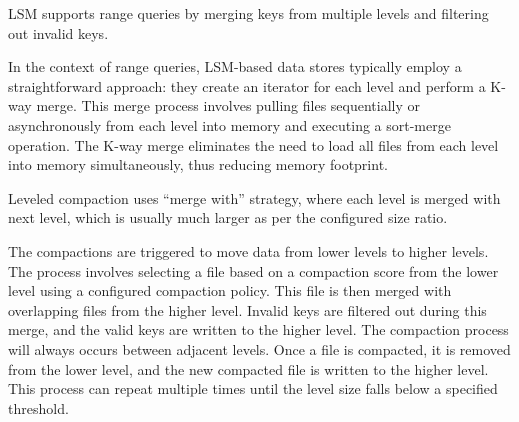  LSM supports range queries by merging keys from multiple levels and filtering out 
invalid keys.

In the context of range queries, LSM-based data stores typically employ a straightforward approach: they create an 
iterator for each level and perform a K-way merge. This merge process involves pulling files sequentially or 
asynchronously from each level into memory and executing a sort-merge operation. The K-way merge eliminates the need 
to load all files from each level into memory simultaneously, thus reducing memory footprint.

 Leveled compaction uses ``merge with'' strategy, where each level is merged with 
next level, which is usually much larger as per the configured size ratio.

The compactions are triggered to move data from lower levels to higher levels. The process involves selecting a file 
based on a compaction score from the lower level using a configured compaction policy. This file is then merged with 
overlapping files from the higher level. Invalid keys are filtered out during this merge, and the valid keys are 
written to the higher level. The compaction process will always occurs between adjacent levels. Once a file is compacted, 
it is removed from the lower level, and the new compacted file is written to the higher level. This process can repeat
multiple times until the level size falls below a specified threshold.